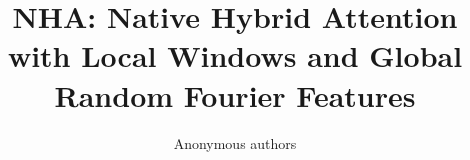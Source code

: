 \title{\textbf{NHA: Native Hybrid Attention with Local Windows and Global Random Fourier Features}}

\author{Anonymous authors}
